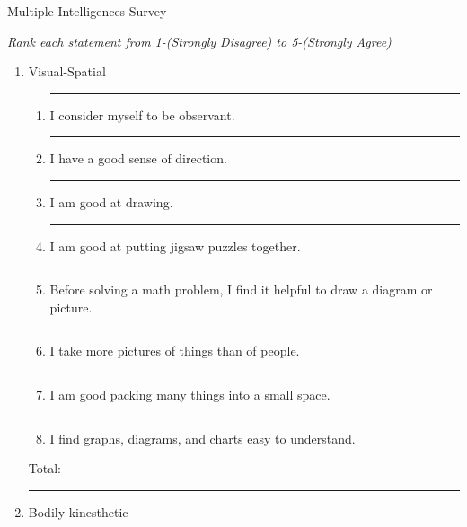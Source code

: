 \documentclass[letterpaper, 11pt]{article}
\begin{document}
	


\begin{center} Multiple Intelligences Survey
\end{center}

\textit{Rank each statement from 1-(Strongly Disagree) to 5-(Strongly Agree)}



\begin{enumerate}


	
\item Visual-Spatial 


	\begin{enumerate}
		
	\item \rule{.5in}{.01in} I consider myself to be observant.
	\item \rule{.5in}{.01in} I have a good sense of direction.
	\item \rule{.5in}{.01in} I am good at drawing.
	\item \rule{.5in}{.01in} I am good at putting jigsaw puzzles together.
	\item \rule{.5in}{.01in} Before solving a math problem, I find it helpful to draw a diagram or picture.
	\item \rule{.5in}{.01in} I take more pictures of things than of people.
	\item \rule{.5in}{.01in} I am good packing many things into a small space.
	\item \rule{.5in}{.01in} I find graphs, diagrams, and charts easy to understand.
	\end{enumerate}
Total:  \rule{.5in}{.01in}

\vspace{.1in}
\item Bodily-kinesthetic


\begin{enumerate}
	

\end{enumerate}
\end{enumerate}
\end{document}

